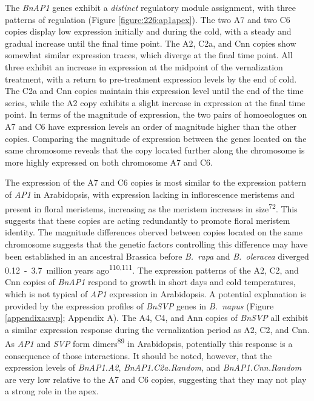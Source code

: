 \documentclass[12pt,]{book}
\begin{document}
The \emph{BnAP1} genes exhibit a \emph{distinct} regulatory module
assignment, with three patterns of regulation (Figure
\ref{figure:226:ap1apex}). The two A7 and two C6 copies display low
expression initially and during the cold, with a steady and gradual
increase until the final time point. The A2, C2a, and Cnn copies show
somewhat similar expression traces, which diverge at the final time
point. All three exhibit an increase in expression at the midpoint of
the vernalization treatment, with a return to pre-treatment expression
levels by the end of cold. The C2a and Cnn copies maintain this
expression level until the end of the time series, while the A2 copy
exhibits a slight increase in expression at the final time point. In
terms of the magnitude of expression, the two pairs of homoeologues on
A7 and C6 have expression levels an order of magnitude higher than the
other copies. Comparing the magnitude of expression between the genes
located on the same chromosome reveals that the copy located further
along the chromosome is more highly expressed on both chromosome A7 and
C6.

The expression of the A7 and C6 copies is most similar to the expression
pattern of \emph{AP1} in Arabidopsis, with expression lacking in
inflorescence meristems and present in floral meristems, increasing as
the meristem increases in size\textsuperscript{72}. This suggests that
these copies are acting redundantly to promote floral meristem identity.
The magnitude differences oberved between copies located on the same
chromosome suggests that the genetic factors controlling this difference
may have been established in an ancestral Brassica before \emph{B.~rapa}
and \emph{B.~oleracea} diverged 0.12~-~3.7~million years
ago\textsuperscript{110,111}. The expression patterns of the A2, C2, and
Cnn copies of \emph{BnAP1} respond to growth in short days and cold
temperatures, which is not typical of \emph{AP1} expression in
Arabidopsis. A potential explanation is provided by the expression
profiles of \emph{BnSVP} genes in \emph{B.~napus} (Figure
\ref{appendixa:svp}; Appendix A). The A4, C4, and Ann copies of
\emph{BnSVP} all exhibit a similar expression response during the
vernalization period as A2, C2, and Cnn. As \emph{AP1} and \emph{SVP}
form dimers\textsuperscript{89} in Arabidopsis, potentially this
response is a consequence of those interactions. It should be noted,
however, that the expression levels of \emph{BnAP1.A2},
\emph{BnAP1.C2a.Random}, and \emph{BnAP1.Cnn.Random} are very low
relative to the A7 and C6 copies, suggesting that they may not play a
strong role in the apex.
\end{document}
